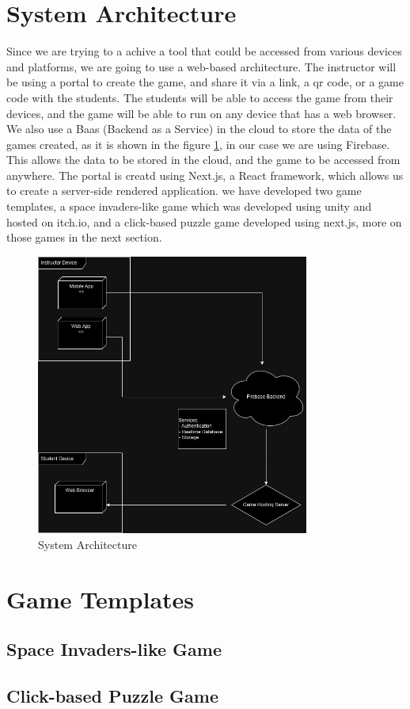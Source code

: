 \section{System Architecture}
Since we are trying to a achive a tool that could be accessed from various devices and platforms, 
we are going to use a web-based architecture. The instructor will be using a portal to create the game, 
and share it via a link, a qr code, or a game code with the students. The students will be able to access the game from their devices, 
and the game will be able to run on any device that has a web browser. 
We also use a Baas (Backend as a Service) in the cloud to store the data of the games created, as it is shown in the figure \ref{fig:architecture}, in our case we are using Firebase.
This allows the data to be stored in the cloud, and the game to be accessed from anywhere.
The portal is creatd using Next.js, a React framework, which allows us to create a server-side rendered application.
we have developed two game templates, a space invaders-like game which was developed using unity and hosted on itch.io,
and a click-based puzzle game developed using next.js, more on those games in the next section.
\begin{figure}
    \centering
    \includegraphics[width=0.8\textwidth]{figures/Deployment_UML.jpg}
    \caption{System Architecture}
    \label{fig:architecture}
\end{figure}

\section{Game Templates}
\subsection{Space Invaders-like Game}

\subsection{Click-based Puzzle Game}